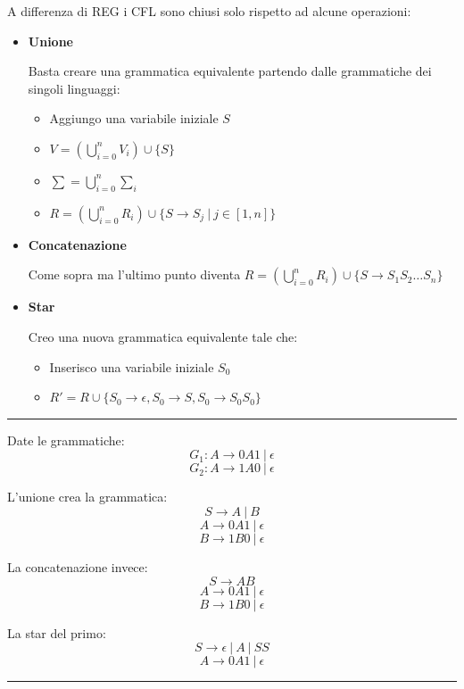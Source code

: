 \documentclass{article}
\begin{document}
A differenza di REG i CFL sono chiusi solo rispetto ad alcune operazioni:
\begin{itemize}
    \item \textbf{Unione}

    Basta creare una grammatica equivalente partendo dalle grammatiche dei singoli linguaggi:
    \begin{itemize}
        \item Aggiungo una variabile iniziale $S$
        \item $V=(\bigcup_{i=0}^n V_i)\cup \{S\}$
        \item $\sum=\bigcup_{i=0}^n \sum_i$
        \item $R=(\bigcup_{i=0}^n R_i)\cup \{S\rightarrow S_j\ |\ j\in[1,n]\}$
    \end{itemize}
    
    \item \textbf{Concatenazione}

    Come sopra ma l'ultimo punto diventa $R=(\bigcup_{i=0}^n R_i)\cup \{S\rightarrow S_1S_2\ldots S_n\}$
    
    \item \textbf{Star}

    Creo una nuova grammatica equivalente tale che:
    \begin{itemize}
        \item Inserisco una variabile iniziale $S_0$
        \item $R'=R\cup \{S_0\rightarrow\epsilon,S_0\rightarrow S,S_0\rightarrow S_0S_0\}$
    \end{itemize}
\end{itemize}

\noindent\rule{\textwidth}{0.5pt}

\noindent Date le grammatiche:
$$G_1:A\rightarrow0A1\ |\ \epsilon$$
$$G_2:A\rightarrow1A0\ |\ \epsilon$$\newline

\noindent L'unione crea la grammatica:
$$S\rightarrow A\ |\ B$$
$$A\rightarrow0A1\ |\ \epsilon$$
$$B\rightarrow1B0\ |\ \epsilon$$

\noindent La concatenazione invece:
$$S\rightarrow AB$$
$$A\rightarrow0A1\ |\ \epsilon$$
$$B\rightarrow1B0\ |\ \epsilon$$

\noindent La star del primo:
$$S\rightarrow \epsilon\ |\ A\ |\ SS$$
$$A\rightarrow0A1\ |\ \epsilon$$

\noindent\rule{\textwidth}{0.5pt}\newline
\end{document}
